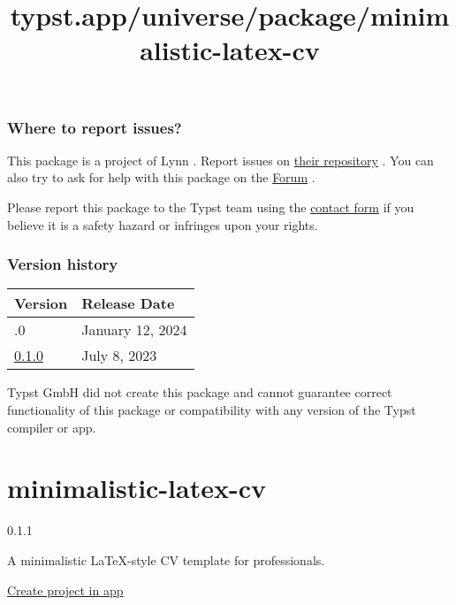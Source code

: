 \subsubsection{Where to report issues?}\label{where-to-report-issues}

This package is a project of Lynn . Report issues on
\href{https://github.com/lynn/typst-syntree}{their repository} . You can
also try to ask for help with this package on the
\href{https://forum.typst.app}{Forum} .

Please report this package to the Typst team using the
\href{https://typst.app/contact}{contact form} if you believe it is a
safety hazard or infringes upon your rights.

\label{versions}
\subsubsection{Version history}\label{version-history}

\begin{longtable}[]{@{}ll@{}}
\toprule\noalign{}
Version & Release Date \\
\midrule\noalign{}
\endhead
\bottomrule\noalign{}
\endlastfoot
0.2.0 & January 12, 2024 \\
\href{https://typst.app/universe/package/syntree/0.1.0/}{0.1.0} & July
8, 2023 \\
\end{longtable}

Typst GmbH did not create this package and cannot guarantee correct
functionality of this package or compatibility with any version of the
Typst compiler or app.


\title{typst.app/universe/package/minimalistic-latex-cv}

\label{banner}
\label{template-thumbnail}

\section{minimalistic-latex-cv}\label{minimalistic-latex-cv}

{ 0.1.1 }

A minimalistic LaTeX-style CV template for professionals.

\href{/app?template=minimalistic-latex-cv&version=0.1.1}{Create project
in app}

